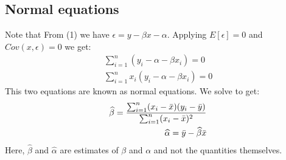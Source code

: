 \documentclass[notoc]{tufte-book}
\begin{document}
\subsection{Normal equations}
Note that From (1) we have $\epsilon=y-\beta x-\alpha $. Applying $E[\epsilon]=0$ and  $Cov(x,\epsilon)=0$ we get:
\begin{align}
    \sum_{i=1}^n (y_i-\alpha-\beta x_i)=0\\
    \sum_{i=1}^n x_i(y_i-\alpha-\beta x_i)=0
\end{align}
This two equations are known as normal equations. We solve to get:
\begin{align}
    \widehat\beta=\frac{\sum_{i=1}^n (x_i-\Bar{x})(y_i-\Bar{y})}{\sum_{i=1}^n (x_i-\Bar{x})^2}\\
    \widehat\alpha=\bar y-\widehat\beta\bar x
\end{align}
Here, $\widehat\beta$ and $\widehat\alpha$ are estimates of $\beta$ and $\alpha$ and not the quantities themselves.
\end{document}
